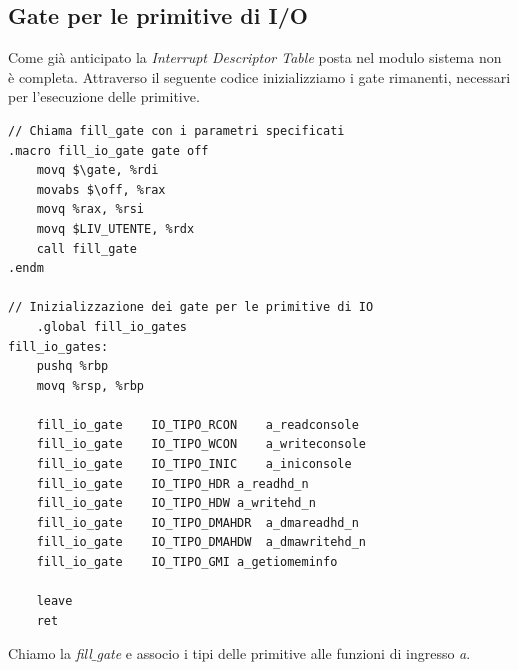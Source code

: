 \documentclass[11pt]{report}
\theoremstyle{definition}
\begin{document}
\subsection{Gate per le primitive di I/O}
Come già anticipato la \emph{Interrupt  Descriptor Table} posta nel modulo sistema non è completa. Attraverso il seguente codice inizializziamo i gate rimanenti, necessari per l'esecuzione delle primitive.
\small 
\begin{verbatim}
// Chiama fill_gate con i parametri specificati
.macro fill_io_gate gate off
    movq $\gate, %rdi
    movabs $\off, %rax
    movq %rax, %rsi
    movq $LIV_UTENTE, %rdx
    call fill_gate
.endm

// Inizializzazione dei gate per le primitive di IO
    .global fill_io_gates
fill_io_gates:
    pushq %rbp
    movq %rsp, %rbp

    fill_io_gate	IO_TIPO_RCON	a_readconsole
    fill_io_gate	IO_TIPO_WCON	a_writeconsole
    fill_io_gate	IO_TIPO_INIC	a_iniconsole
    fill_io_gate	IO_TIPO_HDR	a_readhd_n
    fill_io_gate	IO_TIPO_HDW	a_writehd_n
    fill_io_gate	IO_TIPO_DMAHDR	a_dmareadhd_n
    fill_io_gate	IO_TIPO_DMAHDW	a_dmawritehd_n
    fill_io_gate	IO_TIPO_GMI	a_getiomeminfo

    leave
    ret
\end{verbatim}
\normalsize 
Chiamo la \emph{fill$\_$gate} e associo i tipi delle primitive alle funzioni di ingresso \emph{a}. 
\end{document}
